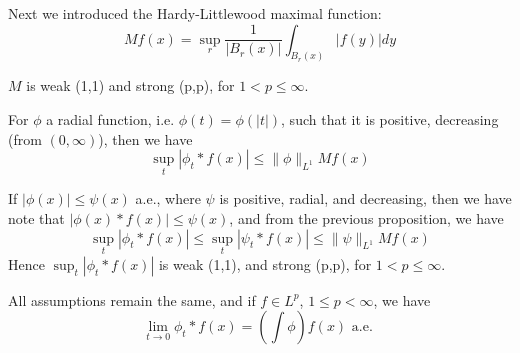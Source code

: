 \documentclass[lang=en,10pt, color=none]{elegantbook}
\begin{document}
Next we introduced the Hardy-Littlewood maximal function:
\begin{equation*}
    Mf(x)=\sup_r\frac{1}{|B_r(x)|}\int_{B_r(x)}|f(y)|dy
\end{equation*}

\begin{theorem}
    $M$ is weak (1,1) and strong (p,p), for $1<p\leq\infty$.
\end{theorem}
\begin{comment}
    And we first showed that it is true for $n=1$, using a covering lemma.
\end{comment}

\begin{proposition}
    For $\phi$ a radial function, i.e. $\phi(t)=\phi(|t|)$, such that it is positive, decreasing (from $(0,\infty)$), then we have
    \begin{equation*}
        \sup_t|\phi_t\ast f(x)|\leq\|\phi\|_{L^1}Mf(x)
    \end{equation*}
\end{proposition}
\begin{comment}
    We showed that it is true for simple functions, and take the limit.
\end{comment}

\begin{corollary}
    If $|\phi(x)|\leq\psi(x)$ a.e., where $\psi$ is positive, radial, and decreasing, then we have note that $|\phi(x)\ast f(x)|\leq\psi(x)$, and from the previous proposition, we have
    \begin{equation*}
        \sup_t|\phi_t\ast f(x)|\leq\sup_t|\psi_t\ast f(x)|\leq\|\psi\|_{L^1}Mf(x)
    \end{equation*}
    Hence $\sup_t|\phi_t\ast f(x)|$ is weak (1,1), and strong (p,p), for $1<p\leq\infty$.
\end{corollary}
\begin{corollary}
    All assumptions remain the same, and if $f\in L^p$, $1\leq p<\infty$, we have
    \begin{equation*}
        \lim_{t\to 0}\phi_t\ast f(x)=\left(\int\phi\right)f(x) \text{ a.e. }
    \end{equation*}
\end{corollary}
\end{document}

